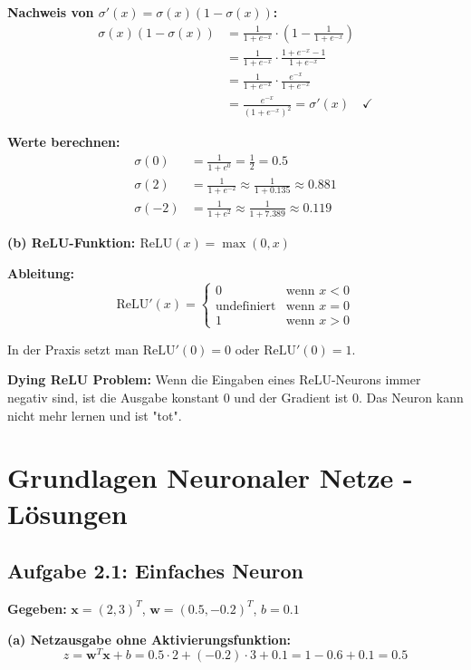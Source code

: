 \documentclass[12pt,a4paper]{article}
\begin{document}
\textbf{Nachweis von $\sigma'(x) = \sigma(x)(1 - \sigma(x))$:}
\begin{align}
\sigma(x)(1 - \sigma(x)) &= \frac{1}{1 + e^{-x}} \cdot \left(1 - \frac{1}{1 + e^{-x}}\right) \\
&= \frac{1}{1 + e^{-x}} \cdot \frac{1 + e^{-x} - 1}{1 + e^{-x}} \\
&= \frac{1}{1 + e^{-x}} \cdot \frac{e^{-x}}{1 + e^{-x}} \\
&= \frac{e^{-x}}{(1 + e^{-x})^2} = \sigma'(x) \quad ✓
\end{align}

\textbf{Werte berechnen:}
\begin{align}
\sigma(0) &= \frac{1}{1 + e^0} = \frac{1}{2} = 0.5 \\
\sigma(2) &= \frac{1}{1 + e^{-2}} \approx \frac{1}{1 + 0.135} \approx 0.881 \\
\sigma(-2) &= \frac{1}{1 + e^2} \approx \frac{1}{1 + 7.389} \approx 0.119
\end{align}

\textbf{(b) ReLU-Funktion: $\text{ReLU}(x) = \max(0, x)$}

\textbf{Ableitung:}
\begin{equation}
\text{ReLU}'(x) = \begin{cases} 
0 & \text{wenn } x < 0 \\
\text{undefiniert} & \text{wenn } x = 0 \\
1 & \text{wenn } x > 0
\end{cases}
\end{equation}

In der Praxis setzt man $\text{ReLU}'(0) = 0$ oder $\text{ReLU}'(0) = 1$.

\textbf{Dying ReLU Problem:} Wenn die Eingaben eines ReLU-Neurons immer negativ sind, ist die Ausgabe konstant 0 und der Gradient ist 0. Das Neuron kann nicht mehr lernen und ist "tot".

\section{Grundlagen Neuronaler Netze - Lösungen}

\subsection{Aufgabe 2.1: Einfaches Neuron}

\textbf{Gegeben:} $\mathbf{x} = (2, 3)^T$, $\mathbf{w} = (0.5, -0.2)^T$, $b = 0.1$

\textbf{(a) Netzausgabe ohne Aktivierungsfunktion:}
\begin{equation}
z = \mathbf{w}^T \mathbf{x} + b = 0.5 \cdot 2 + (-0.2) \cdot 3 + 0.1 = 1 - 0.6 + 0.1 = 0.5
\end{equation}
\end{document}
